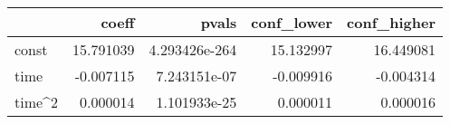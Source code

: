 \begin{tabular}{lrrrr}
\toprule
{} &      coeff &          pvals &  conf\_lower &  conf\_higher \\
\midrule
const  &  15.791039 &  4.293426e-264 &   15.132997 &    16.449081 \\
time   &  -0.007115 &   7.243151e-07 &   -0.009916 &    -0.004314 \\
time\textasciicircum 2 &   0.000014 &   1.101933e-25 &    0.000011 &     0.000016 \\
\bottomrule
\end{tabular}
